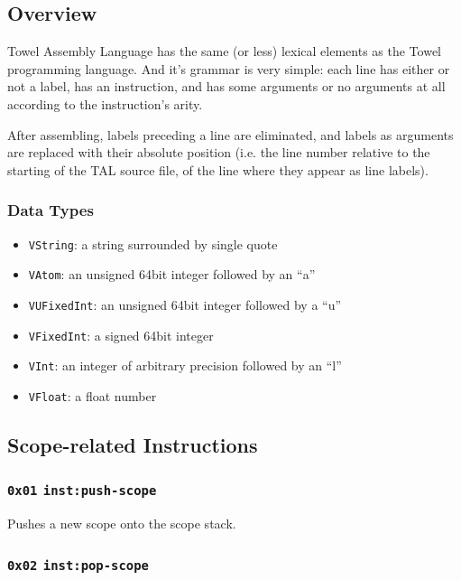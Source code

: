 \documentclass{article}
\newcommand{\inst}[1] {\texttt{inst:#1}}
\begin{document}
\subsection{Overview}

Towel Assembly Language has the same (or less) lexical elements as the Towel programming language. And it's grammar is very simple: each line has either or not a label, has an instruction, and has some arguments or no arguments at all according to the instruction's arity.

After assembling, labels preceding a line are eliminated, and labels as arguments are replaced with their absolute position (i.e. the line number relative to the starting of the TAL source file, of the line where they appear as line labels).

\subsubsection{Data Types}

\begin{itemize}
\item \texttt{VString}: a string surrounded by single quote
\item \texttt{VAtom}: an unsigned 64bit integer followed by an ``a''
\item \texttt{VUFixedInt}: an unsigned 64bit integer followed by a ``u''
\item \texttt{VFixedInt}: a signed 64bit integer
\item \texttt{VInt}: an integer of arbitrary precision followed by an ``l''
\item \texttt{VFloat}: a float number
\end{itemize}

\subsection{Scope-related Instructions}

\subsubsection{\texttt{0x01} \inst{push-scope}}

Pushes a new scope onto the scope stack.

\subsubsection{\texttt{0x02} \inst{pop-scope}}
\end{document}
